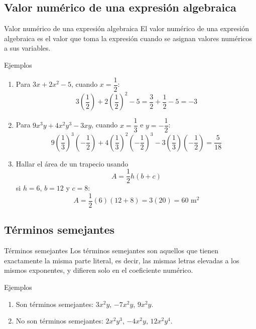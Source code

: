 \documentclass[10pt,handout,aspectratio=169]{beamer}
\begin{document}
	\subsection{Valor numérico de una expresión algebraica}
	
	\begin{frame}{Valor numérico de una expresión algebraica}
		El valor numérico de una expresión algebraica es el valor que toma la expresión cuando se asignan valores numéricos a sus variables.
		
		\begin{block}{Ejemplos}
			\begin{enumerate}
				\item Para $3x+2x^{2}-5$, cuando $x=\dfrac{1}{2}$:
				\[
				3\left(\frac12\right)+2\left(\frac12\right)^2-5
				=\frac32+\frac12-5=-3
				\]
				
				\item Para $9x^{3}y+4x^{2}y^{3}-3xy$, cuando $x=\dfrac13$ e $y=-\dfrac12$:
				\[
				9\left(\frac13\right)^3\left(-\frac12\right)
				+4\left(\frac13\right)^2\left(-\frac12\right)^3
				-3\left(\frac13\right)\left(-\frac12\right)
				=\frac{5}{18}
				\]
				
				\item Hallar el área de un trapecio usando
				\[
				A=\frac{1}{2}h(b+c)
				\]
				si $h=6$, $b=12$ y $c=8$:
				\[
				A=\frac{1}{2}(6)(12+8)=3(20)=60\text{ m}^2
				\]
			\end{enumerate}
		\end{block}
	\end{frame}
	
	\subsection{Términos semejantes}
	
	\begin{frame}{Términos semejantes}
		Los términos semejantes son aquellos que tienen exactamente la misma parte literal, es decir, las mismas letras elevadas a los mismos exponentes, y difieren solo en el coeficiente numérico.
		
		\begin{block}{Ejemplos}
			\begin{enumerate}
				\item Son términos semejantes: $3x^{2}y$, $-7x^{2}y$, $9x^{2}y$.
				\item No son términos semejantes: $2x^{2}y^{3}$, $-4x^{2}y$, $12x^{2}y^{4}$.
			\end{enumerate}
		\end{block}
	\end{frame}
	
\end{document}
